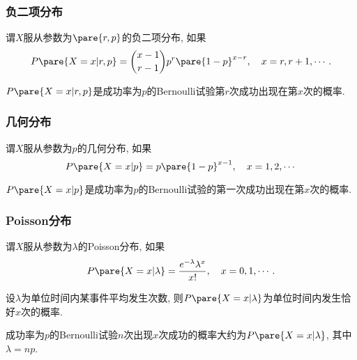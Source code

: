 \documentclass{ctexart}
\begin{document}

\subsubsection{负二项分布} %
\label{ssub:负二项分布}

\begin{definition}[负二项分布]
    谓$X$服从参数为$\pare{r,p}$的负二项分布, 如果
    \[ P\pare{X=x\vert r,p} = \binom{x-1}{r-1}p^r\pare{1-p}^{x-r},\quad x = r, r+1, \cdots. \]
\end{definition}
\begin{lemma}[负二项分布的诠释]
    $P\pare{X=x\vert r,p}$是成功率为$p$的Bernoulli试验第$r$次成功出现在第$x$次的概率.
\end{lemma}


\subsubsection{几何分布} %
\label{ssub:几何分布}

\begin{definition}[几何分布]
    谓$X$服从参数为$p$的几何分布, 如果
    \[ P\pare{X=x\vert p} = p\pare{1-p}^{x-1},\quad x = 1,2,\cdots \]
\end{definition}
\begin{lemma}[几何分布的诠释]
    $P\pare{X=x\vert p}$是成功率为$p$的Bernoulli试验的第一次成功出现在第$x$次的概率.
\end{lemma}


\subsubsection{Poisson分布} %
\label{ssub:poisson分布}

\begin{definition}[Poisson分布]
    谓$X$服从参数为$\lambda$的Poisson分布, 如果
    \[ P\pare{X=x\vert\lambda} = \frac{e^{-\lambda}\lambda^x}{x!},\quad x = 0, 1, \cdots. \]
\end{definition}
\begin{lemma}[Poisson分布的诠释]
    设$\lambda$为单位时间内某事件平均发生次数, 则$P\pare{X=x\vert \lambda}$为单位时间内发生恰好$x$次的概率.
\end{lemma}
\begin{lemma}[Poisson近似]
    成功率为$p$的Bernoulli试验$n$次出现$x$次成功的概率大约为$P\pare{X=x\vert\lambda}$, 其中$\lambda = np$.
\end{lemma}



\end{document}
